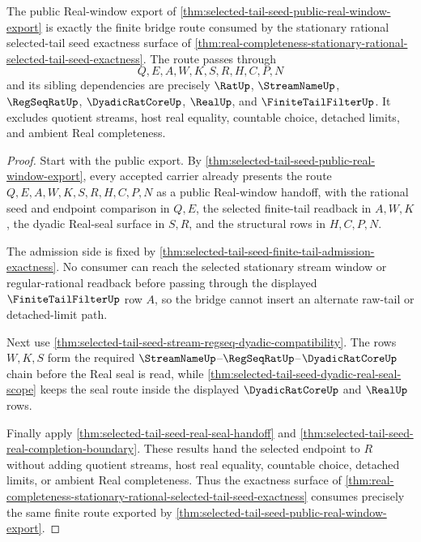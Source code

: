 \begin{theorem}
\label{thm:selected-tail-seed-real-completion-bridge}
The public Real-window export of \autoref{thm:selected-tail-seed-public-real-window-export} is exactly the finite bridge route consumed by the stationary rational selected-tail seed exactness surface of \autoref{thm:real-completeness-stationary-rational-selected-tail-seed-exactness}. The route passes through
$$
Q,E,A,W,K,S,R,H,C,P,N
$$
and its sibling dependencies are precisely $\RatUp$, $\StreamNameUp$, $\RegSeqRatUp$, $\DyadicRatCoreUp$, $\RealUp$, and $\FiniteTailFilterUp$. It excludes quotient streams, host real equality, countable choice, detached limits, and ambient Real completeness.
\end{theorem}
\begin{proof}
Start with the public export. By \autoref{thm:selected-tail-seed-public-real-window-export}, every accepted carrier already presents the route $Q,E,A,W,K,S,R,H,C,P,N$ as a public Real-window handoff, with the rational seed and endpoint comparison in $Q,E$, the selected finite-tail readback in $A,W,K$, the dyadic Real-seal surface in $S,R$, and the structural rows in $H,C,P,N$.

The admission side is fixed by \autoref{thm:selected-tail-seed-finite-tail-admission-exactness}. No consumer can reach the selected stationary stream window or regular-rational readback before passing through the displayed $\FiniteTailFilterUp$ row $A$, so the bridge cannot insert an alternate raw-tail or detached-limit path.

Next use \autoref{thm:selected-tail-seed-stream-regseq-dyadic-compatibility}. The rows $W,K,S$ form the required $\StreamNameUp$--$\RegSeqRatUp$--$\DyadicRatCoreUp$ chain before the Real seal is read, while \autoref{thm:selected-tail-seed-dyadic-real-seal-scope} keeps the seal route inside the displayed $\DyadicRatCoreUp$ and $\RealUp$ rows.

Finally apply \autoref{thm:selected-tail-seed-real-seal-handoff} and \autoref{thm:selected-tail-seed-real-completion-boundary}. These results hand the selected endpoint to $R$ without adding quotient streams, host real equality, countable choice, detached limits, or ambient Real completeness. Thus the exactness surface of \autoref{thm:real-completeness-stationary-rational-selected-tail-seed-exactness} consumes precisely the same finite route exported by \autoref{thm:selected-tail-seed-public-real-window-export}.
\end{proof}

